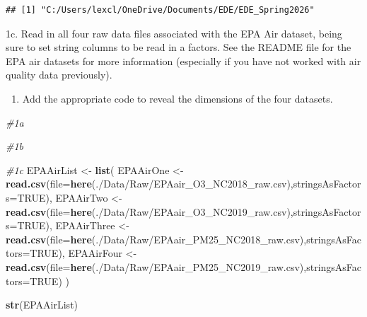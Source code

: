 \documentclass[
]{article}
\newenvironment{Shaded}{\begin{snugshade}}{\end{snugshade}}
\newcommand{\AttributeTok}[1]{\textcolor[rgb]{0.13,0.29,0.53}{#1}}
\newcommand{\CommentTok}[1]{\textcolor[rgb]{0.56,0.35,0.01}{\textit{#1}}}
\newcommand{\ConstantTok}[1]{\textcolor[rgb]{0.56,0.35,0.01}{#1}}
\newcommand{\FunctionTok}[1]{\textcolor[rgb]{0.13,0.29,0.53}{\textbf{#1}}}
\newcommand{\NormalTok}[1]{#1}
\newcommand{\OtherTok}[1]{\textcolor[rgb]{0.56,0.35,0.01}{#1}}
\newcommand{\StringTok}[1]{\textcolor[rgb]{0.31,0.60,0.02}{#1}}
\providecommand{\tightlist}{%
  \setlength{\itemsep}{0pt}\setlength{\parskip}{0pt}}
\begin{document}
\begin{verbatim}
## [1] "C:/Users/lexcl/OneDrive/Documents/EDE/EDE_Spring2026"
\end{verbatim}

1c. Read in all four raw data files associated with the EPA Air dataset,
being sure to set string columns to be read in a factors. See the README
file for the EPA air datasets for more information (especially if you
have not worked with air quality data previously).

\begin{enumerate}
\def\labelenumi{\arabic{enumi}.}
\setcounter{enumi}{1}
\tightlist
\item
  Add the appropriate code to reveal the dimensions of the four
  datasets.
\end{enumerate}

\begin{Shaded}
\begin{Highlighting}[]
\CommentTok{\#1a }

\CommentTok{\#1b }

\CommentTok{\#1c }
\NormalTok{EPAAirList }\OtherTok{\textless{}{-}} \FunctionTok{list}\NormalTok{(}
\NormalTok{  EPAAirOne }\OtherTok{\textless{}{-}} \FunctionTok{read.csv}\NormalTok{(}\AttributeTok{file=}\FunctionTok{here}\NormalTok{(}\StringTok{\textquotesingle{}./Data/Raw/EPAair\_O3\_NC2018\_raw.csv\textquotesingle{}}\NormalTok{),}\AttributeTok{stringsAsFactors=}\ConstantTok{TRUE}\NormalTok{),}
\NormalTok{  EPAAirTwo }\OtherTok{\textless{}{-}}\FunctionTok{read.csv}\NormalTok{(}\AttributeTok{file=}\FunctionTok{here}\NormalTok{(}\StringTok{\textquotesingle{}./Data/Raw/EPAair\_O3\_NC2019\_raw.csv\textquotesingle{}}\NormalTok{),}\AttributeTok{stringsAsFactors=}\ConstantTok{TRUE}\NormalTok{),}
\NormalTok{  EPAAirThree }\OtherTok{\textless{}{-}} \FunctionTok{read.csv}\NormalTok{(}\AttributeTok{file=}\FunctionTok{here}\NormalTok{(}\StringTok{\textquotesingle{}./Data/Raw/EPAair\_PM25\_NC2018\_raw.csv\textquotesingle{}}\NormalTok{),}\AttributeTok{stringsAsFactors=}\ConstantTok{TRUE}\NormalTok{),}
\NormalTok{  EPAAirFour }\OtherTok{\textless{}{-}} \FunctionTok{read.csv}\NormalTok{(}\AttributeTok{file=}\FunctionTok{here}\NormalTok{(}\StringTok{\textquotesingle{}./Data/Raw/EPAair\_PM25\_NC2019\_raw.csv\textquotesingle{}}\NormalTok{),}\AttributeTok{stringsAsFactors=}\ConstantTok{TRUE}\NormalTok{)}
\NormalTok{)}
    
\FunctionTok{str}\NormalTok{(EPAAirList)}
\end{Highlighting}
\end{Shaded}
\end{document}
